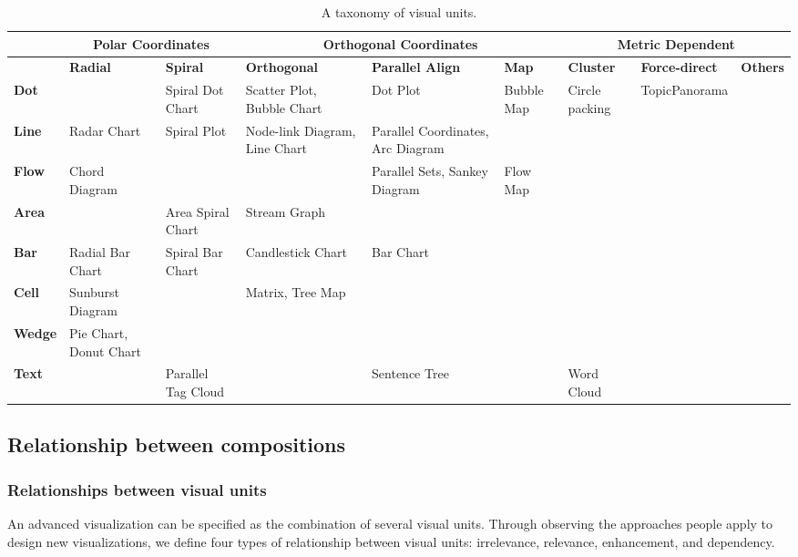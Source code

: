 \begin{table*}[tb]
  \caption{A taxonomy of visual units.}
  \label{tab:unit}
  \small
  \centering
  \begin{tabular}{|p{1.2cm}|p{1.2cm}|p{1.2cm}|p{1.2cm}|p{1.2cm}|p{1.2cm}|p{1.2cm}|p{1.2cm}|p{1.2cm}|}
  \toprule
   \textbf{} &\multicolumn{2}{|c|}{Polar Coordinates} &\multicolumn{3}{|c|}{Orthogonal Coordinates}&\multicolumn{3}{|c|}{Metric Dependent}   \\ 
  \midrule
  
 \textbf{} &\textbf{Radial} &\textbf{Spiral} &\textbf{Orthogonal} & \textbf{Parallel Align}&\textbf{Map}&\textbf{Cluster}&\textbf{Force-direct}&\textbf{Others}   \\ 
  \midrule
  \textbf{Dot} &    &Spiral Dot Chart&Scatter Plot, Bubble Chart & Dot Plot & Bubble Map &  Circle packing    &TopicPanorama\cite{7042494}  &    \\
  \midrule
  \textbf{Line}&  Radar Chart   &  Spiral Plot    &Node-link Diagram, Line Chart & Parallel Coordinates, Arc Diagram &    &   &     & \\ 
  \midrule
   \textbf{Flow}&  Chord Diagram   &    & &Parallel Sets, Sankey Diagram & 
   Flow Map  &   &   &\\
  \midrule
  \textbf{Area}&    &Area Spiral Chart &Stream Graph &  & & &   &\\ 
  \midrule
  \textbf{Bar}&      Radial Bar Chart & Spiral Bar Chart  & Candlestick Chart & Bar Chart  &    &    &    &\\
  \midrule
  \textbf{Cell}& Sunburst Diagram  &    & Matrix, Tree Map &     & & &   &\\
  \midrule
  \textbf{Wedge}& Pie Chart, Donut Chart &  &   &   &  &    &   &\\
  \midrule
  \textbf{Text}&    &Parallel Tag Cloud \cite{collins2009parallel} &    &  Sentence Tree  &     &Word Cloud  &   &    \\
  \bottomrule
  
  \end{tabular}
  \vspace{1mm}
\end{table*}


\subsection{Relationship between compositions}
\subsubsection{Relationships between visual units}
An advanced visualization can be specified as the combination of several visual units. Through observing the approaches people apply to design new visualizations, we define four types of relationship between visual units: irrelevance, relevance, enhancement, and dependency. 

